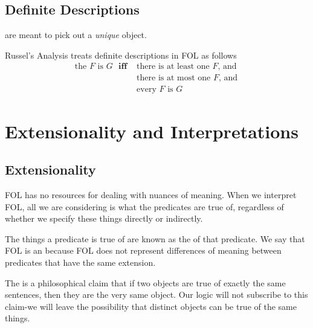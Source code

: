 \documentclass[12pt, a4paper, oneside, openright, titlepage]{book}
\begin{document}
\section{\textsection Definite Descriptions}

\begin{defn}
     are meant to pick out a \emph{unique} object.
\end{defn}


\begin{defn}
    Russel's Analysis treats definite descriptions in FOL as follows \begin{align*}
            \text{the $F$ is $G$ } \textbf{iff }& \text{there is at least one $F$, and }\\
            &\text{there is at most one $F$, and} \\
            &\text{every $F$ is $G$}
    \end{align*}
\end{defn}


\chapter{\textsection\textsection Extensionality and Interpretations}


\section{\textsection Extensionality}

\begin{rmk}
    FOL has no resources for dealing with nuances of meaning. When we interpret FOL, all we are considering is what the predicates are true of, regardless of whether we specify these things directly or indirectly.
\end{rmk}


\begin{defn}
    The things a predicate is true of are known as the  of that predicate. We say that FOL is an  because FOL does not represent differences of meaning between predicates that have the same extension.
\end{defn}

\begin{rmk}
    The  is a philosophical claim that if two objects are true of exactly the same sentences, then they are the very same object. Our logic will not subscribe to this claim-we will leave the possibility that distinct objects can be true of the same things.
\end{rmk}
\end{document}
